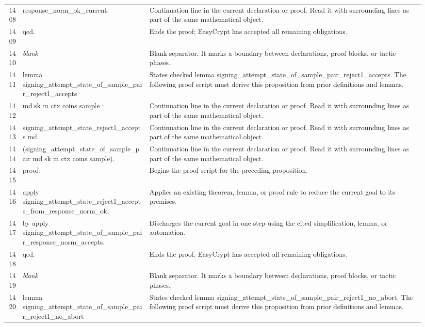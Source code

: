 \documentclass[10pt]{article}
\begin{document}
\begin{longtable}{r L{0.53\textwidth} L{0.37\textwidth}}
1408 & {\ttfamily\scriptsize            response\_norm\_ok\_current.} & Continuation line in the current declaration or proof.  Read it with surrounding lines as part of the same mathematical object. \\
1409 & {\ttfamily\scriptsize qed.} & Ends the proof; EasyCrypt has accepted all remaining obligations. \\
1410 & {\ttfamily\scriptsize \emph{blank}} & Blank separator.  It marks a boundary between declarations, proof blocks, or tactic phases. \\
1411 & {\ttfamily\scriptsize lemma signing\_attempt\_state\_of\_sample\_pair\_reject1\_accepts} & States checked lemma signing\_attempt\_state\_of\_sample\_pair\_reject1\_accepts.  The following proof script must derive this proposition from prior definitions and lemmas. \\
1412 & {\ttfamily\scriptsize    md sk m ctx coins sample :} & Continuation line in the current declaration or proof.  Read it with surrounding lines as part of the same mathematical object. \\
1413 & {\ttfamily\scriptsize   signing\_attempt\_state\_reject1\_accepts md} & Continuation line in the current declaration or proof.  Read it with surrounding lines as part of the same mathematical object. \\
1414 & {\ttfamily\scriptsize     (signing\_attempt\_state\_of\_sample\_pair md sk m ctx coins sample).} & Continuation line in the current declaration or proof.  Read it with surrounding lines as part of the same mathematical object. \\
1415 & {\ttfamily\scriptsize proof.} & Begins the proof script for the preceding proposition. \\
1416 & {\ttfamily\scriptsize apply signing\_attempt\_state\_reject1\_accepts\_from\_response\_norm\_ok.} & Applies an existing theorem, lemma, or proof rule to reduce the current goal to its premises. \\
1417 & {\ttfamily\scriptsize by apply signing\_attempt\_state\_of\_sample\_pair\_response\_norm\_accepts.} & Discharges the current goal in one step using the cited simplification, lemma, or automation. \\
1418 & {\ttfamily\scriptsize qed.} & Ends the proof; EasyCrypt has accepted all remaining obligations. \\
1419 & {\ttfamily\scriptsize \emph{blank}} & Blank separator.  It marks a boundary between declarations, proof blocks, or tactic phases. \\
1420 & {\ttfamily\scriptsize lemma signing\_attempt\_state\_of\_sample\_pair\_reject1\_no\_abort} & States checked lemma signing\_attempt\_state\_of\_sample\_pair\_reject1\_no\_abort.  The following proof script must derive this proposition from prior definitions and lemmas. \\

\end{longtable}
\end{document}
